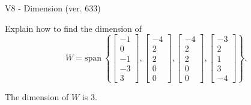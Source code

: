 \begin{exercise}
  \begin{exerciseTitle}V8 - Dimension (ver. 633)\end{exerciseTitle}
  \begin{exerciseStatement}
    Explain how to find the dimension of 
\[W=\mathrm{span}\ \left\{\left[\begin{array}{r}
-1 \\
0 \\
-1 \\
-3 \\
3
\end{array}\right] , \left[\begin{array}{r}
-4 \\
2 \\
2 \\
0 \\
0
\end{array}\right] , \left[\begin{array}{r}
-4 \\
2 \\
2 \\
0 \\
0
\end{array}\right] , \left[\begin{array}{r}
-3 \\
2 \\
1 \\
3 \\
-4
\end{array}\right]\right\}.\]



  \end{exerciseStatement}
  \begin{exerciseAnswer}
   The dimension of \(W\) is  \(3\).
  


  \end{exerciseAnswer}
\end{exercise}
